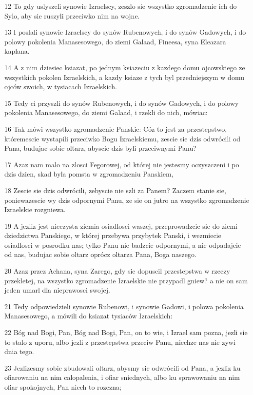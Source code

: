 \par 12 To gdy uslyszeli synowie Izraelscy, zeszlo sie wszystko zgromadzenie ich do Sylo, aby sie ruszyli przeciwko nim na wojne.
\par 13 I poslali synowie Izraelscy do synów Rubenowych, i do synów Gadowych, i do polowy pokolenia Manasesowego, do ziemi Galaad, Fineesa, syna Eleazara kaplana.
\par 14 A z nim dziesiec ksiazat, po jednym ksiazeciu z kazdego domu ojcowskiego ze wszystkich pokolen Izraelskich, a kazdy ksiaze z tych byl przedniejszym w domu ojców swoich, w tysiacach Izraelskich.
\par 15 Tedy ci przyszli do synów Rubenowych, i do synów Gadowych, i do polowy pokolenia Manasesowego, do ziemi Galaad, i rzekli do nich, mówiac:
\par 16 Tak mówi wszystko zgromadzenie Panskie: Cóz to jest za przestepstwo, któremescie wystapili przeciwko Bogu Izraelskiemu, zescie sie dzis odwrócili od Pana, budujac sobie oltarz, abyscie dzis byli przeciwnymi Panu?
\par 17 Azaz nam malo na zlosci Fegorowej, od której nie jestesmy oczyszczeni i po dzis dzien, skad byla pomsta w zgromadzeniu Panskiem,
\par 18 Zescie sie dzis odwrócili, zebyscie nie szli za Panem? Zaczem stanie sie, poniewazescie wy dzis odpornymi Panu, ze sie on jutro na wszystko zgromadzenie Izraelskie rozgniewa.
\par 19 A jezliz jest nieczysta ziemia osiadlosci waszej, przeprowadzcie sie do ziemi dziedzictwa Panskiego, w której przebywa przybytek Panski, i wezmiecie osiadlosci w posrodku nas; tylko Panu nie badzcie odpornymi, a nie odpadajcie od nas, budujac sobie oltarz oprócz oltarza Pana, Boga naszego.
\par 20 Azaz przez Achana, syna Zarego, gdy sie dopuscil przestepstwa w rzeczy przekletej, na wszystko zgromadzenie Izraelskie nie przypadl gniew? a nie on sam jeden umarl dla nieprawosci swojej.
\par 21 Tedy odpowiedzieli synowie Rubenowi, i synowie Gadowi, i polowa pokolenia Manasesowego, a mówili do ksiazat tysiaców Izraelskich:
\par 22 Bóg nad Bogi, Pan, Bóg nad Bogi, Pan, on to wie, i Izrael sam pozna, jezli sie to stalo z uporu, albo jezli z przestepstwa przeciw Panu, niechze nas nie zywi dnia tego.
\par 23 Jezlizesmy sobie zbudowali oltarz, abysmy sie odwrócili od Pana, a jezliz ku ofiarowaniu na nim calopalenia, i ofiar sniednych, albo ku sprawowaniu na nim ofiar spokojnych, Pan niech to rozezna;
